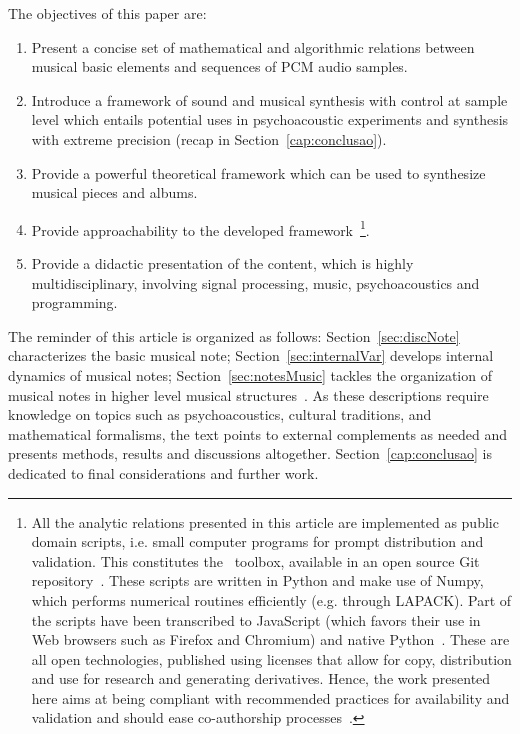 The objectives of this paper are:
\begin{enumerate}
	\item Present a concise set of mathematical and algorithmic relations between musical basic elements and sequences of PCM audio samples.
	\item Introduce a framework of sound and musical synthesis with control at sample level which entails potential uses in psychoacoustic experiments and synthesis with extreme precision (recap in Section~\ref{cap:conclusao}).
	\item Provide a powerful theoretical framework which can be used to synthesize musical pieces and albums.
	\item Provide approachability to the developed framework~\footnote{All
		the analytic relations presented in this article are implemented as public domain scripts,
		i.e. small computer programs for prompt distribution and validation.
		This constitutes the \massa\ toolbox, available in an open source Git repository~\cite{gitBook}.
		These scripts are written in Python and make use of Numpy,
		which performs numerical routines efficiently (e.g. through LAPACK).
		Part of the scripts have been transcribed to JavaScript (which favors their use in Web browsers such as Firefox and Chromium) and native Python~\cite{numpy, audiolab, tutpython, python}.
		These are all open technologies, published using licenses that allow for copy,
		distribution and use for research and generating derivatives.
		Hence, the work presented here aims at being compliant with recommended
		practices for availability and validation
		and should ease co-authorship processes~\cite{Raymond,Lessig}.}.
	\item Provide a didactic presentation of the content, which is highly multidisciplinary,
		involving signal processing, music, psychoacoustics and programming.
\end{enumerate}

The reminder of this article is organized as follows:
Section~\ref{sec:discNote} characterizes the basic musical note;
Section~\ref{sec:internalVar} develops internal dynamics of musical notes;
Section~\ref{sec:notesMusic} tackles the organization of musical notes in
higher level musical structures~\cite{Wisnick,Webern,Lerdahl,Cook,Lacerda,Zamacois,Schoenberg,microsound}.
As these descriptions require knowledge on topics such as psychoacoustics, cultural traditions,
and mathematical formalisms, the text points to external complements as needed
and presents methods, results and discussions altogether.
Section~\ref{cap:conclusao} is dedicated to final considerations and further work.

